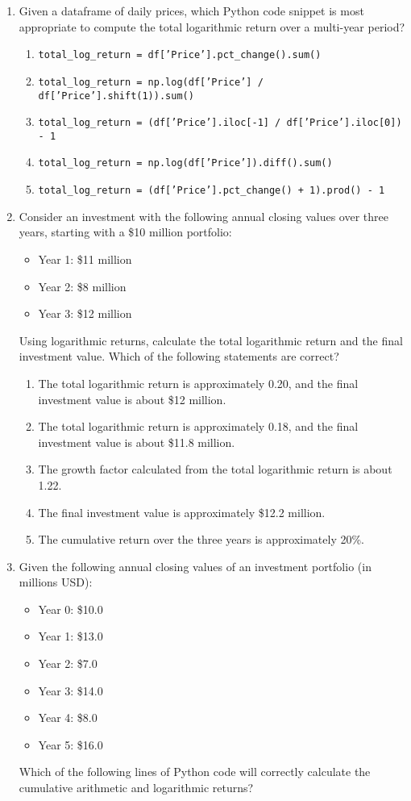 \documentclass{article}
\begin{document}
\begin{enumerate}
    \item Given a dataframe of daily prices, which Python code snippet is most appropriate to compute the total logarithmic return over a multi-year period?
    \begin{enumerate}
        \item \texttt{total\_log\_return = df['Price'].pct\_change().sum()}
        \item \texttt{total\_log\_return = np.log(df['Price'] / df['Price'].shift(1)).sum()}
        \item \texttt{total\_log\_return = (df['Price'].iloc[-1] / df['Price'].iloc[0]) - 1}
        \item \texttt{total\_log\_return = np.log(df['Price']).diff().sum()}
        \item \texttt{total\_log\_return = (df['Price'].pct\_change() + 1).prod() - 1}
    \end{enumerate}

    \item Consider an investment with the following annual closing values over three years, starting with a \$10 million portfolio:
    \begin{itemize}
        \item Year 1: \$11 million
        \item Year 2: \$8 million
        \item Year 3: \$12 million
    \end{itemize}
    Using logarithmic returns, calculate the total logarithmic return and the final investment value. Which of the following statements are correct?
    \begin{enumerate}
        \item The total logarithmic return is approximately 0.20, and the final investment value is about \$12 million.
        \item The total logarithmic return is approximately 0.18, and the final investment value is about \$11.8 million.
        \item The growth factor calculated from the total logarithmic return is about 1.22.
        \item The final investment value is approximately \$12.2 million.
        \item The cumulative return over the three years is approximately 20\%.
    \end{enumerate}

    \item Given the following annual closing values of an investment portfolio (in millions USD):
    \begin{itemize}
        \item Year 0: \$10.0
        \item Year 1: \$13.0
        \item Year 2: \$7.0
        \item Year 3: \$14.0
        \item Year 4: \$8.0
        \item Year 5: \$16.0
    \end{itemize}
    Which of the following lines of Python code will correctly calculate the cumulative arithmetic and logarithmic returns?
    

\end{enumerate}
\end{document}
